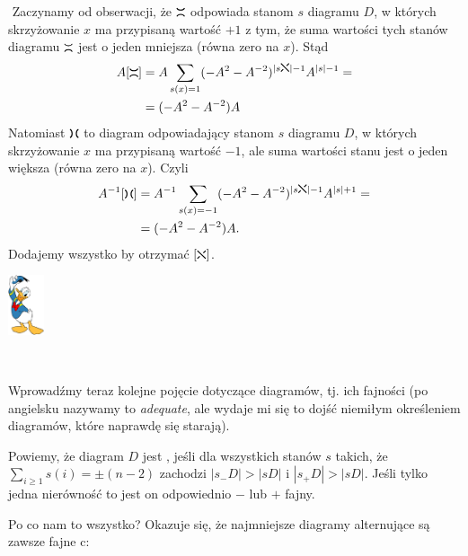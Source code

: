 \documentclass{article}
\renewenvironment{proof}{{\bfseries\color{orange} Dowód}$ $\newline}{
  \begin{flushright}\includegraphics[width=30pt]{Donald_Duck.png}\end{flushright}$ $\newline
}
\begin{document}
\begin{proof}
  Zaczynamy od obserwacji, że $\goradol$ odpowiada stanom $s$ diagramu $D$, w których skrzyżowanie $x$ ma przypisaną wartość $+1$ z tym, że suma wartości tych stanów diagramu $\goradol$ jest o jeden mniejsza (równa zero na $x$). Stąd
  \begin{align*}
    A[\goradol] &= A\sum_{s(x)=1}(-A^2-A^{-2})^{|s\iksik|-1}A^{|s|-1}=\\ 
                &=(-A^2-A^{-2})A
  \end{align*}
  Natomiast $\lewoprawo$ to diagram odpowiadający stanom $s$ diagramu $D$, w których skrzyżowanie $x$ ma przypisaną wartość $-1$, ale suma wartości stanu jest o jeden większa (równa zero na $x$). Czyli
  \begin{align*}
    A^{-1}[\lewoprawo]&=A^{-1}\sum_{s(x)=-1}(-A^2-A^{-2})^{|s\iksik|-1}A^{|s|+1}=\\ 
                      &=(-A^2-A^{-2})A.
  \end{align*}
  Dodajemy wszystko by otrzymać $[\iksik]$.
\end{proof}

Wprowadźmy teraz kolejne pojęcie dotyczące diagramów, tj. ich fajności (po angielsku nazywamy to \emph{adequate}, ale wydaje mi się to dojść niemiłym określeniem diagramów, które naprawdę się starają).

\begin{deff}
  Powiemy, że diagram $D$ jest , jeśli dla wszystkich stanów $s$ takich, że $\sum_{i\geq 1}s(i)=\pm(n-2)$ zachodzi $|s_-D|>|sD|$ i $|s_+D|>|sD|$. Jeśli tylko jedna nierówność to jest on odpowiednio $-$ lub $+$ fajny.
\end{deff}

Po co nam to wszystko? Okazuje się, że najmniejsze diagramy alternujące są zawsze fajne c:
\end{document}
